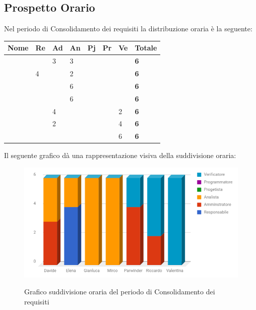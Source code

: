 \documentclass[PianoDiProgetto.tex]{subfiles}
\begin{document}
\subsection{Prospetto Orario}
Nel periodo di Consolidamento dei requisiti la distribuzione oraria è la seguente:
\begin{center}

\begin{table}[htbp]
	\centering
	\renewcommand\arraystretch{1.5}
	\begin{tabularx}{\textwidth}{p{4cm}|p{1cm}|p{1cm}|p{1cm}|p{1cm}|p{1cm}|p{1cm}|p{2cm}}
		\hline
		\textbf{Nome} & \textbf{Re} & \textbf{Ad} & \textbf{An} & \textbf{Pj} & \textbf{Pr} & \textbf{Ve} & \textbf{Totale} \\
		\hline
		\Davide & \ & 3 & 3 & \ & \ & \ & \textbf{6} \\
		\hline
		\Elena & 4 & \ & 2 & \ & \ & \ & \textbf{6} \\
		\hline
		\Gianluca & \ & \ & 6 & \ & \ & \ & \textbf{6} \\
		\hline
		\Mirco & \ & \ & 6 & \ & \ & \ & \textbf{6} \\
		\hline
		\Parwinder & \ & 4 & \ & \ & \ & 2 & \textbf{6} \\
		\hline
		\Riccardo & \ & 2 & \ & \ & \ & 4 & \textbf{6} \\
		\hline
		\Valentina & \ & \ & \ & \ & \ & 6 & \textbf{6} \\
		\hline
	\end{tabularx}
\end{table}
\end{center}

Il seguente grafico dà una rappresentazione visiva della suddivisione oraria:

\begin{figure}[h]
	\centering
	\includegraphics[width=14.5cm]{images/prospettoOrario/consolidamento.png}
	\label{fig:foo}
	\caption{Grafico suddivisione oraria del periodo di Consolidamento dei requisiti}
\end{figure} 
\clearpage
\end{document}
